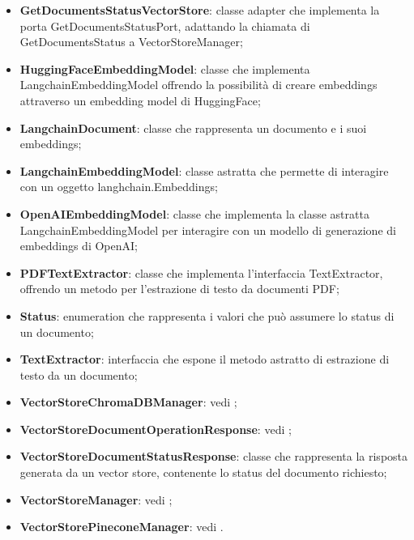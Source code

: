 \documentclass[10pt, a4paper]{article}
\begin{document}
\begin{itemize}
    \item \label{GetDocumentsStatusVectorStore}\textbf{GetDocumentsStatusVectorStore}: classe adapter che implementa la porta GetDocumentsStatusPort, adattando la chiamata di GetDocumentsStatus a VectorStoreManager;
    \item \label{HuggingFaceEmbeddingModel}\textbf{HuggingFaceEmbeddingModel}: classe che implementa LangchainEmbeddingModel offrendo la possibilità di creare embeddings attraverso un embedding model di HuggingFace;
    \item \label{LangchainDocument}\textbf{LangchainDocument}: classe che rappresenta un documento e i suoi embeddings;    
    \item \label{LangchainEmbeddingModel}\textbf{LangchainEmbeddingModel}: classe astratta che permette di interagire con un oggetto langhchain.Embeddings;
    \item \label{OpenAIEmbeddingModel}\textbf{OpenAIEmbeddingModel}: classe che implementa la classe astratta LangchainEmbeddingModel per interagire con un modello di generazione di embeddings di OpenAI;
    \item \label{PDFTextExtractor}\textbf{PDFTextExtractor}: classe che implementa l'interfaccia TextExtractor, offrendo un metodo per l'estrazione di testo da documenti PDF;
    \item \label{Status}\textbf{Status}: enumeration che rappresenta i valori che può assumere lo status di un documento;
    \item \label{TextExtractor}\textbf{TextExtractor}: interfaccia che espone il metodo astratto di estrazione di testo da un documento;   
    \item \textbf{VectorStoreChromaDBManager}: vedi ;
    \item \textbf{VectorStoreDocumentOperationResponse}: vedi ;
    \item \label{VectorStoreDocumentStatusResponse}\textbf{VectorStoreDocumentStatusResponse}: classe che rappresenta la risposta generata da un vector store, contenente lo status del documento richiesto;
    \item \textbf{VectorStoreManager}: vedi ;
    \item \textbf{VectorStorePineconeManager}: vedi .
\end{itemize}
\end{document}
